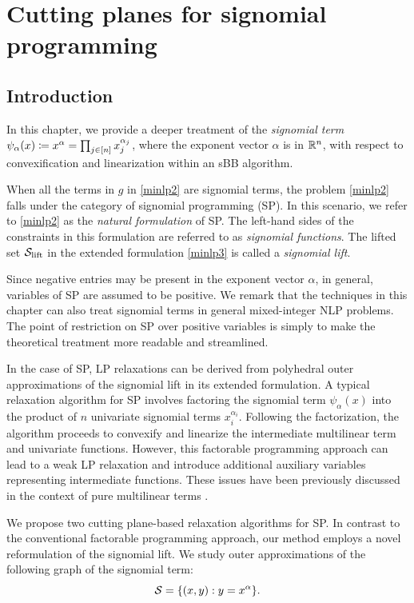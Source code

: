 \chapter{Cutting planes for signomial programming }
\label{chap.sig}

\section{Introduction}


In this chapter, we provide a deeper treatment of the \emph{signomial term} $\psi_{\alpha}(x) \coloneqq x^{\alpha} =\prod_{j \in [n]} x_j^{\alpha_j}$, where  the exponent vector $\alpha$ is in $\mathbb R^n$, with respect to convexification and linearization within an sBB algorithm. 

When all the terms in $g$ in \eqref{minlp2} are signomial terms, the problem \eqref{minlp2} falls under the category of signomial programming (SP). In this scenario, we refer to \eqref{minlp2} as the \emph{natural formulation} of SP. The left-hand sides of the constraints in this formulation are referred to as \emph{signomial functions}. The lifted set $\mathcal S_{\mathrm{lift}}$ in the extended formulation \eqref{minlp3} is called a \emph{signomial lift}. 

Since negative entries may be present in the exponent vector $\alpha$, in general, variables of SP are assumed to be positive. We remark that the  techniques in this chapter can also treat signomial terms in general mixed-integer NLP problems. The point of restriction on  SP over positive variables is simply to make the theoretical treatment more readable and
streamlined.

In the case of SP, LP relaxations can be derived from polyhedral outer approximations of the signomial lift in its extended formulation.
A typical relaxation algorithm for SP involves factoring the signomial term $\psi_{\alpha}(x)$ into the product of $n$ univariate signomial terms $x_i^{\alpha_i}$. Following the factorization, the algorithm proceeds to convexify and linearize the intermediate multilinear term and univariate functions. However, this factorable programming approach can lead to a weak LP relaxation and introduce additional auxiliary variables representing intermediate functions. These issues have been previously discussed in the context of pure multilinear terms \cite{cafieri2010convex, costa2012relaxations, speakman2017quantifying}.


We propose two cutting plane-based relaxation algorithms for SP. In contrast to the conventional factorable programming approach, our method employs a novel reformulation of the signomial lift. We study outer approximations of the following graph of the signomial term:
\begin{equation}
    \mathcal S = \{(x,y): y = x^\alpha\}.
\end{equation}

